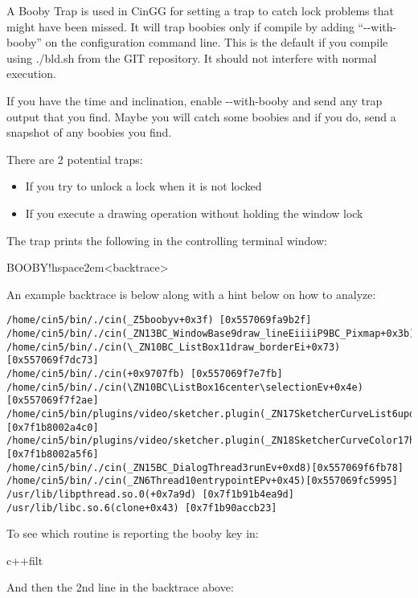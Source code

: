 A Booby Trap is used in CinGG for setting a trap to catch lock problems that might have been missed. It will trap boobies only if compile by adding ``-{}-with-booby'' on the configuration command line. This is the default if you compile using ./bld.sh from the GIT repository. It should not interfere with normal execution.
\medskip

If you have the time and inclination, enable -{}-with-booby and send any trap output that you find. Maybe you will catch some boobies and if you do, send a snapshot of any boobies you find.
\medskip

There are 2 potential traps:
\begin{itemize}[nosep]
	\item If you try to unlock a lock when it is not locked
	\item If you execute a drawing operation without holding the window lock
\end{itemize}
\medskip

The trap prints the following in the controlling terminal window:
\medskip

\hspace{2em}BOOBY!hspace{2em}{\textless}backtrace{\textgreater}
\medskip

An example backtrace is below along with a hint below on how to analyze:

\begin{lstlisting}[numbers=none]
/home/cin5/bin/./cin(_Z5boobyv+0x3f) [0x557069fa9b2f] /home/cin5/bin/./cin(_ZN13BC_WindowBase9draw_lineEiiiiP9BC_Pixmap+0x3b)0x557069fb9a9b]
/home/cin5/bin/./cin(\_ZN10BC_ListBox11draw_borderEi+0x73)[0x557069f7dc73]
/home/cin5/bin/./cin(+0x9707fb) [0x557069f7e7fb]
/home/cin5/bin/./cin(\ZN10BC\ListBox16center\selectionEv+0x4e)[0x557069f7f2ae]
/home/cin5/bin/plugins/video/sketcher.plugin(_ZN17SketcherCurveList6updateEi+0x1a0)[0x7f1b8002a4c0]
/home/cin5/bin/plugins/video/sketcher.plugin(_ZN18SketcherCurveColor17handle_done_eventEi+0x76)[0x7f1b8002a5f6]
/home/cin5/bin/./cin(_ZN15BC_DialogThread3runEv+0xd8)[0x557069f6fb78]
/home/cin5/bin/./cin(_ZN6Thread10entrypointEPv+0x45)[0x557069fc5995]
/usr/lib/libpthread.so.0(+0x7a9d) [0x7f1b91b4ea9d]
/usr/lib/libc.so.6(clone+0x43) [0x7f1b90accb23]
\end{lstlisting}

To see which routine is reporting the booby key in:
\smallskip

\hspace{2em}c++filt
\smallskip

And then the 2nd line in the backtrace above:
\smallskip

